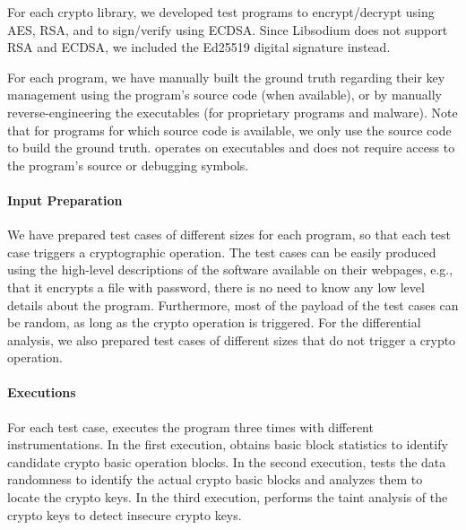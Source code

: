 For each crypto library, we developed test programs to encrypt/decrypt using  \textsf{\small AES, RSA}, and to sign/verify using \textsf{\small  ECDSA}. Since \textsf{\small Libsodium} does not support \textsf{\small RSA} and \textsf{\small ECDSA}, we included the \textsf{\small Ed25519} digital signature instead.

For each program, we have manually built the ground truth regarding their key management using the program's source code (when available), or by manually reverse-engineering the executables (for proprietary programs and malware). 
Note that for programs for which source code is available, we only use the source code to build the ground truth. 
\sysname operates on executables and does not require access to the program's source or debugging symbols.

\paragraph{Input Preparation} %
We  have prepared test cases of different sizes for each program, so that each test case triggers a cryptographic operation.
The test cases can be easily produced using the high-level descriptions of the software available on their webpages, 
e.g., that it encrypts a file with password, 
there is no need to know any low level details about the program. 
Furthermore, most of the payload of the test cases can be random, as long as the crypto operation is triggered.  
For the differential analysis, we also prepared test cases of different sizes that do not trigger a crypto operation. 

\paragraph{Executions} 
For each test case, \sysname executes the program three times with different instrumentations. 
In the first execution, \sysname obtains basic block statistics to identify candidate crypto basic operation blocks. 
In the second execution, \sysname tests the data randomness to identify the actual crypto basic blocks and analyzes them to locate the crypto keys. 
In the third execution, \sysname performs the taint analysis of the crypto keys to detect insecure crypto keys.
   
